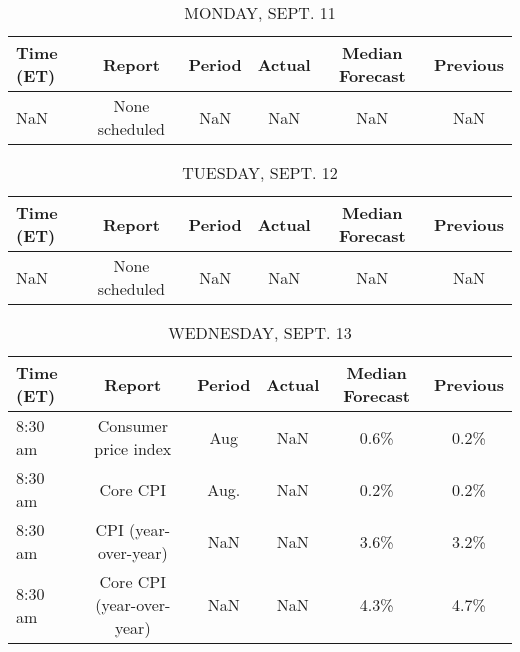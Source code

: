 \documentclass{article}%
\begin{document}
%
\normalsize%


\begin{table}[htbp]%
\caption{MONDAY, SEPT. 11}%
\centering%
\begin{adjustbox}{width=1\textwidth}%
\begin{tabular}{lccccc}
\toprule
Time (ET) &         Report & Period & Actual & Median Forecast & Previous \\
\midrule
      NaN & None scheduled &    NaN &    NaN &             NaN &      NaN \\
\bottomrule
\end{tabular}
%
\end{adjustbox}%
\end{table}

%


\begin{table}[htbp]%
\caption{TUESDAY, SEPT. 12}%
\centering%
\begin{adjustbox}{width=1\textwidth}%
\begin{tabular}{lccccc}
\toprule
Time (ET) &         Report & Period & Actual & Median Forecast & Previous \\
\midrule
      NaN & None scheduled &    NaN &    NaN &             NaN &      NaN \\
\bottomrule
\end{tabular}
%
\end{adjustbox}%
\end{table}

%


\begin{table}[htbp]%
\caption{WEDNESDAY, SEPT. 13}%
\centering%
\begin{adjustbox}{width=1\textwidth}%
\begin{tabular}{lccccc}
\toprule
Time (ET) &                    Report & Period & Actual & Median Forecast & Previous \\
\midrule
  8:30 am &      Consumer price index &    Aug &    NaN &            0.6\% &     0.2\% \\
  8:30 am &                  Core CPI &   Aug. &    NaN &            0.2\% &     0.2\% \\
  8:30 am &      CPI (year-over-year) &    NaN &    NaN &            3.6\% &     3.2\% \\
  8:30 am & Core CPI (year-over-year) &    NaN &    NaN &            4.3\% &     4.7\% \\
\bottomrule
\end{tabular}
%
\end{adjustbox}%
\end{table}
\end{document}
